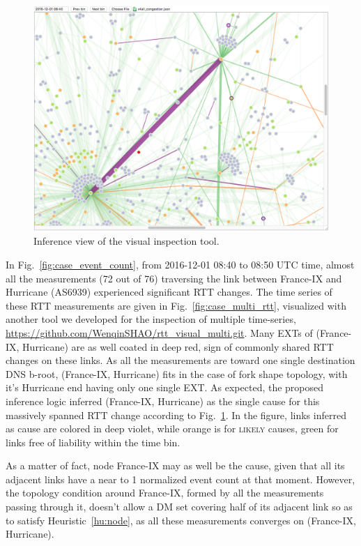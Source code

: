 \begin{figure}[!htb]
\centering
\includegraphics[width=1\textwidth]{gfx/chap5/case_infer_res.png}
\caption{Inference view of the visual inspection tool.}
\label{fig:case_infer_res}
\end{figure}

In Fig.~\ref{fig:case_event_count}, from 2016-12-01 08:40 to 08:50 UTC time, almost all the measurements (72 out of 76) traversing the link between France-IX and Hurricane (AS6939) experienced significant RTT changes.
The time series of these RTT measurements are given in Fig.~\ref{fig:case_multi_rtt}, visualized with another tool we developed for the inspection of multiple time-series, \url{https://github.com/WenqinSHAO/rtt_visual_multi.git}. Many \acp{EXT} of (France-IX, Hurricane) are as well coated in deep red, sign of commonly shared RTT changes on these links. As all the measurements are toward one single destination DNS b-root, 
(France-IX, Hurricane) fits in the case of fork shape topology, with it's Hurricane end having only one single \ac{EXT}. As expected, the proposed inference logic inferred (France-IX, Hurricane) as the single cause for this massively spanned RTT change according to Fig.~\ref{fig:case_infer_res}. In the figure, links inferred as cause are colored in deep violet, while orange is for \textsc{likely} causes, green for links free of liability within the time bin.

As a matter of fact, node France-IX may as well be the cause, given that all its adjacent links have a near to 1 normalized event count at that moment. However, the topology condition around France-IX, formed by all the measurements passing through it, doesn't allow a \ac{DM} set covering half of its adjacent link so as to satisfy Heuristic~\ref{hu:node}, as all these measurements converges on (France-IX, Hurricane).

